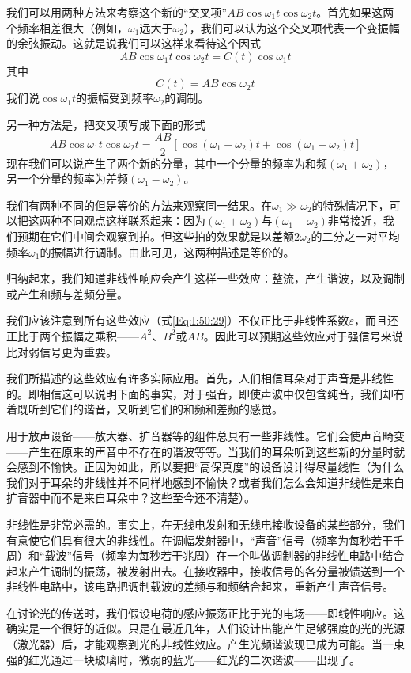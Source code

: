我们可以用两种方法来考察这个新的“交叉项”$AB \cos\omega_1 t \cos\omega_2 t$。首先如果这两个频率相差很大（例如，$\omega_1$远大于$\omega_2$），我们可以认为这个交叉项代表一个变振幅的余弦振动。这就是说我们可以这样来看待这个因式
\begin{equation}
    \label{Eq:I:50:30}
    AB \cos\omega_1 t \cos\omega_2 t = C(t)\cos\omega_1 t
\end{equation}
其中
\begin{equation}
    \label{Eq:I:50:31}
    C(t) = AB\cos\omega_2 t
\end{equation}
我们说$\cos\omega_1 t$的振幅受到频率$\omega_2$的调制。

另一种方法是，把交叉项写成下面的形式
\begin{equation}
    \label{Eq:I:50:32}
    AB\cos\omega_1t\cos\omega_2t=\frac{AB}{2}\left[\cos(\omega_1+\omega_2)t+\cos(\omega_1-\omega_2)t\right]
\end{equation}
现在我们可以说产生了两个新的分量，其中一个分量的频率为和频$(\omega_1 +\omega_2)$，另一个分量的频率为差频$(\omega_1 -\omega_2)$。

我们有两种不同的但是等价的方法来观察同一结果。在$\omega_1 \gg \omega_2$的特殊情况下，可以把这两种不同观点这样联系起来：因为$(\omega_1 +\omega_2)$与$(\omega_1 -\omega_2)$非常接近，我们预期在它们中间会观察到拍。但这些拍的效果就是以差额$2\omega_2$的二分之一对平均频率$\omega_1$的振幅进行调制。由此可见，这两种描述是等价的。

归纳起来，我们知道非线性响应会产生这样一些效应：整流，产生谐波，以及调制或产生和频与差频分量。

我们应该注意到所有这些效应（式\ref{Eq:I:50:29}）不仅正比于非线性系数$\varepsilon$，而且还正比于两个振幅之乘积——$A^2$、$B^2$或$AB$。因此可以预期这些效应对于强信号来说比对弱信号更为重要。

我们所描述的这些效应有许多实际应用。首先，人们相信耳朵对于声音是非线性的。即相信这可以说明下面的事实，对于强音，即使声波中仅包含纯音，我们却有着既听到它们的谐音，又听到它们的和频和差频的感觉。

用于放声设备——放大器、扩音器等的组件总具有一些非线性。它们会使声音畸变——产生在原来的声音中不存在的谐波等等。当我们的耳朵听到这些新的分量时就会感到不愉快。正因为如此，所以要把“高保真度”的设备设计得尽量线性（为什么我们对于耳朵的非线性并不同样地感到不愉快？或者我们怎么会知道非线性是来自扩音器中而不是来自耳朵中？这些至今还不清楚）。

非线性是非常必需的。事实上，在无线电发射和无线电接收设备的某些部分，我们有意使它们具有很大的非线性。在调幅发射器中，“声音”信号（频率为每秒若干千周）和“载波”信号（频率为每秒若干兆周）在一个叫做调制器的非线性电路中结合起来产生调制的振荡，被发射出去。在接收器中，接收信号的各分量被馈送到一个非线性电路中，该电路把调制载波的差频与和频结合起来，重新产生声音信号。

在讨论光的传送时，我们假设电荷的感应振荡正比于光的电场——即线性响应。这确实是一个很好的近似。只是在最近几年，人们设计出能产生足够强度的光的光源（激光器）后，才能观察到光的非线性效应。产生光频谐波现已成为可能。当一束强的红光通过一块玻璃时，微弱的蓝光——红光的二次谐波——出现了。